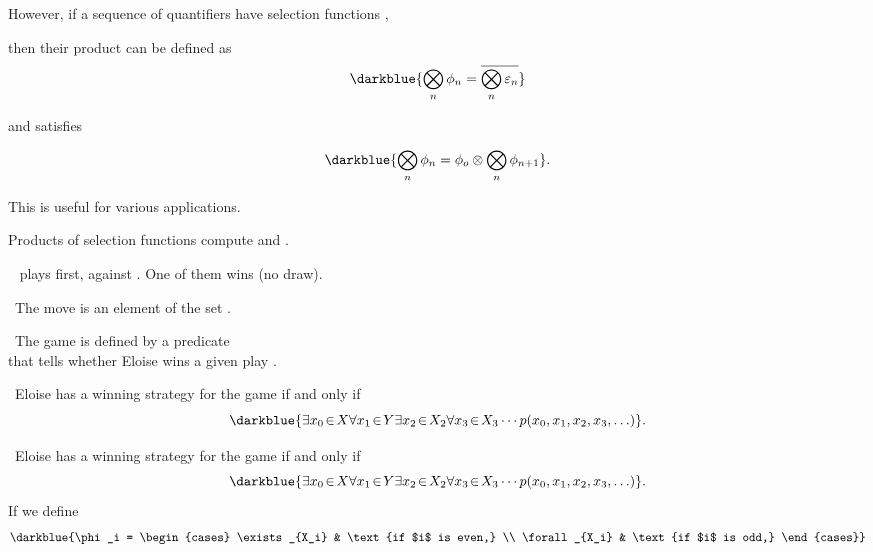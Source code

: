 \documentclass%
[%
Screen4to3,
]{foils}
\begin{document}
However, if a sequence of quantifiers  have
selection functions ,

then their product can be defined as
\[
\darkblue{\bigotimes_n \phi_n = \overline{\bigotimes_n \varepsilon_n}}
\]

and satisfies

\[
\darkblue{\bigotimes_n \phi_n = \phi_o \otimes \bigotimes_n \phi_{n+1}}.
\]

This is useful for various applications.




Products of selection functions compute  and . 



\vfill

~ plays first, against
. One of them wins (no draw).

\vfill

~The  move is an
element of the set .

\vfill

~The game is defined by
a predicate 
\\ \phantom{xx} that tells whether Eloise wins
a given play . 

\vfill

~Eloise has a winning strategy for the
game  if and only if
\[
\darkblue{\exists x_0 \!\in\! X \forall x_1 \!\in\! Y\exists x_{2} \!\in\! X_{2} \forall x_{3} \!\in\! X_{3} \cdots p(x_0, x_1, x_2, x_3, \ldots)}.
\]


~Eloise has a winning strategy for the game  if
and only if
\[
\darkblue{\exists x_0 \!\in\! X \forall x_1 \!\in\! Y\exists x_{2} \!\in\! X_{2} \forall x_{3} \!\in\! X_{3} \cdots p(x_0, x_1, x_2, x_3, \ldots)}.
\]
If we define
\[
  \darkblue{\phi_i =  
  \begin{cases}
    \exists_{X_i} & \text{if $i$ is even,} \\
    \forall_{X_i} & \text{if $i$ is odd,} 
  \end{cases}}
\]
\end{document}
